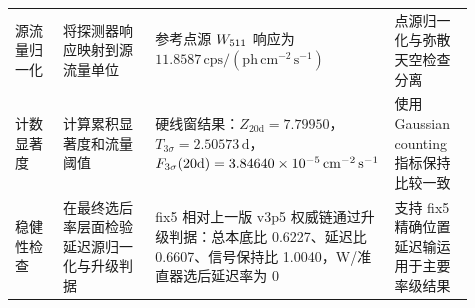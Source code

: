 \begin{table}[t]
\begin{tabular}{@{}p{0.12\linewidth}p{0.25\linewidth}p{0.36\linewidth}p{0.18\linewidth}@{}}
源流量归一化 & 将探测器响应映射到源流量单位 & 参考点源 $W_{511}$ 响应为 $11.8587\,\mathrm{cps}/(\mathrm{ph\,cm^{-2}\,s^{-1}})$ & 点源归一化与弥散天空检查分离 \\
计数显著度 & 计算累积显著度和流量阈值 & 硬线窗结果：$Z_{20\mathrm{d}}=7.79950$，$T_{3\sigma}=2.50573\,\mathrm{d}$，$F_{3\sigma}(20\mathrm{d})=3.84640\times10^{-5}\,\mathrm{cm^{-2}\,s^{-1}}$ & 使用 Gaussian counting 指标保持比较一致 \\
稳健性检查 & 在最终选后率层面检验延迟源归一化与升级判据 & fix5 相对上一版 v3p5 权威链通过升级判据：总本底比 0.6227、延迟比 0.6607、信号保持比 1.0040，W/准直器选后延迟率为 0 & 支持 fix5 精确位置延迟输运用于主要率级结果 \\
\bottomrule
\end{tabular}
\endgroup
\end{table}
